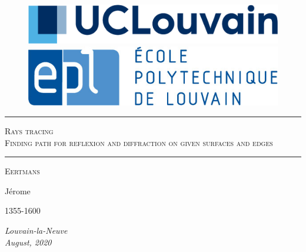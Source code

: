 \thispagestyle{empty}
\begin{figure}[H]
    \begin{minipage}[c]{.46\linewidth}
        \includegraphics[scale=0.7]{UCL-2.png}
    \end{minipage}
    \hfill%
    \begin{minipage}[c]{.46\linewidth}
    \flushright
        \includegraphics[scale=0.3]{EPL-3.jpg}
    \end{minipage}
\end{figure}

\vspace{1.6cm}
\noindent
\rule{\linewidth}{.5pt}
\begin{center}

\huge \textsc{Rays tracing} \vspace{1cm}
\\
\huge \textsc{Finding path for reflexion and diffraction on given surfaces and edges} \\
\rule{\linewidth}{.4pt}
\end{center}

\vspace{0.5cm}
{\large \begin{multicols}{3}
     \begin{flushright} \textsc{Eertmans}
     \end{flushright}
     \begin{center} 
     Jérome
     \end{center}
     \begin{flushleft} 
    1355-1600
     \end{flushleft}
     \end{multicols} \par}
\vfill

\vfill
\begin{center}
    \textit{Louvain-la-Neuve}\\
    \textit{August, 2020}
\end{center}